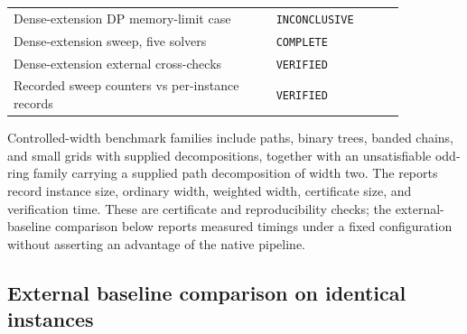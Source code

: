 \documentclass[11pt]{article}
\theoremstyle{plain}
\theoremstyle{definition}
\theoremstyle{remark}
\begin{document}
\begin{center}
\begin{tabular}{@{}p{0.58\linewidth}p{0.28\linewidth}@{}}
Dense-extension DP memory-limit case & \texttt{INCONCLUSIVE}\\
Dense-extension sweep, five solvers & \texttt{COMPLETE}\\
Dense-extension external cross-checks & \texttt{VERIFIED}\\
Recorded sweep counters vs per-instance records & \texttt{VERIFIED}\\
\bottomrule
\end{tabular}
\label{tab:verification-gate}
\end{center}

Controlled-width benchmark families include paths, binary trees,
banded chains, and small grids with supplied decompositions, together with an
unsatisfiable odd-ring family carrying a supplied path decomposition of width
two.  The reports record instance size, ordinary width, weighted width,
certificate size, and verification time.  These are certificate and
reproducibility checks; the external-baseline comparison below reports measured
timings under a fixed configuration without asserting an advantage of the
native pipeline.

\subsection{External baseline comparison on identical instances}
\label{subsec:external-baselines}
\end{document}
